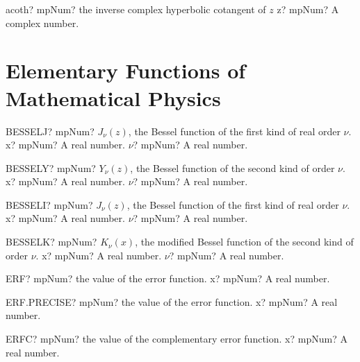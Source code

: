 \documentclass[12pt,a4paper,openany]{book}
\begin{document}
\begin{mpFunctionsExtract}
\mpFunctionOne
{acoth? mpNum? the inverse complex hyperbolic cotangent of $z$}
{z? mpNum? A complex number.}
\end{mpFunctionsExtract}

\section{Elementary Functions of Mathematical Physics}

\begin{mpFunctionsExtract}
\mpWorksheetFunctionTwoNotImplemented
{BESSELJ? mpNum? $J_{\nu}(z)$, the Bessel function of the first kind of real order $\nu$.}
{x? mpNum? A real number.}
{$\nu$? mpNum? A real number.}
\end{mpFunctionsExtract}

\begin{mpFunctionsExtract}
\mpWorksheetFunctionTwoNotImplemented
{BESSELY? mpNum? $Y_{\nu}(z)$, the Bessel function of the second kind of order $\nu$.}
{x? mpNum? A real number.}
{$\nu$? mpNum? A real number.}
\end{mpFunctionsExtract}

\begin{mpFunctionsExtract}
\mpWorksheetFunctionTwoNotImplemented
{BESSELI? mpNum? $J_{\nu}(z)$, the Bessel function of the first kind of real order $\nu$.}
{x? mpNum? A real number.}
{$\nu$? mpNum? A real number.}
\end{mpFunctionsExtract}

\begin{mpFunctionsExtract}
\mpWorksheetFunctionTwoNotImplemented
{BESSELK? mpNum?  $K_{\nu}(x)$, the modified Bessel function of the second kind of order $\nu$.}
{x? mpNum? A real number.}
{$\nu$? mpNum? A real number.}
\end{mpFunctionsExtract}

\begin{mpFunctionsExtract}
\mpWorksheetFunctionOneNotImplemented
{ERF? mpNum? the value of the error function.}
{x? mpNum? A real number.}
\end{mpFunctionsExtract}

\begin{mpFunctionsExtract}
\mpWorksheetFunctionOneNotImplemented
{ERF.PRECISE? mpNum? the value of the error function.}
{x? mpNum? A real number.}
\end{mpFunctionsExtract}

\begin{mpFunctionsExtract}
\mpWorksheetFunctionOneNotImplemented
{ERFC? mpNum? the value of the complementary error function.}
{x? mpNum? A real number.}
\end{mpFunctionsExtract}
\end{document}
